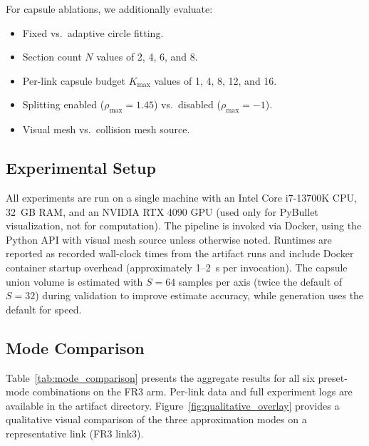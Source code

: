 For capsule ablations, we additionally evaluate:
\begin{itemize}
    \item Fixed vs.\ adaptive circle fitting.
    \item Section count $N$ values of 2, 4, 6, and 8.
    \item Per-link capsule budget $K_{\max}$ values of 1, 4, 8, 12, and 16.
    \item Splitting enabled ($\rho_{\max}=1.45$) vs.\ disabled ($\rho_{\max}=-1$).
    \item Visual mesh vs.\ collision mesh source.
\end{itemize}

\subsection{Experimental Setup}

All experiments are run on a single machine with an Intel Core i7-13700K CPU, 32~GB RAM, and an NVIDIA RTX 4090 GPU (used only for PyBullet visualization, not for computation).
The pipeline is invoked via Docker, using the Python API with visual mesh source unless otherwise noted.
Runtimes are reported as recorded wall-clock times from the artifact runs and include Docker container startup overhead (approximately 1--2~s per invocation).
The capsule union volume is estimated with $S = 64$ samples per axis (twice the default of $S = 32$) during validation to improve estimate accuracy, while generation uses the default for speed.

\subsection{Mode Comparison}

Table~\ref{tab:mode_comparison} presents the aggregate results for all six preset-mode combinations on the FR3 arm.
Per-link data and full experiment logs are available in the artifact directory.
Figure~\ref{fig:qualitative_overlay} provides a qualitative visual comparison of the three approximation modes on a representative link (FR3 link3).

